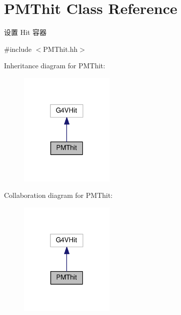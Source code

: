 \hypertarget{classPMThit}{}\section{P\+M\+Thit Class Reference}
\label{classPMThit}


设置 Hit 容器  




{\ttfamily \#include $<$P\+M\+Thit.\+hh$>$}



Inheritance diagram for P\+M\+Thit\+:\nopagebreak
\begin{figure}[H]
\begin{center}
\leavevmode
\includegraphics[width=129pt]{classPMThit__inherit__graph}
\end{center}
\end{figure}


Collaboration diagram for P\+M\+Thit\+:\nopagebreak
\begin{figure}[H]
\begin{center}
\leavevmode
\includegraphics[width=129pt]{classPMThit__coll__graph}
\end{center}
\end{figure}
